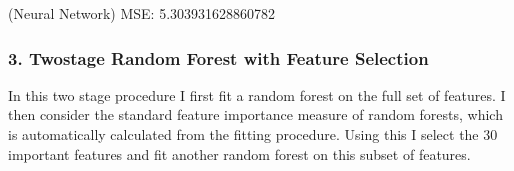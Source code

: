\documentclass[letterpaper,10pt,english]{sphinxmanual}
\begin{document}
\begin{sphinxVerbatim}[commandchars=\\\{\}]
  
       
 

  
   
\end{sphinxVerbatim}

\begin{sphinxVerbatim}[commandchars=\\\{\}]
(Neural Network) MSE: 5.303931628860782
\end{sphinxVerbatim}


\subsubsection{3. Two\sphinxhyphen{}stage Random Forest with Feature Selection}
\label{\detokenize{simulated_final:two-stage-random-forest-with-feature-selection}}
In this two stage procedure I first fit a random forest on the full set of features. I then consider the standard feature importance measure of random forests, which is automatically calculated from the fitting procedure. Using this I select the 30  important features and fit another random forest on this subset of features.

\end{document}
